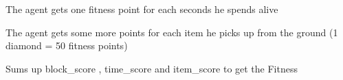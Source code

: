\documentclass[letterpaper,10pt,english]{sphinxmanual}
\begin{document}
\begin{fulllineitems}

\begin{fulllineitems}
\label{\detokenize{index:mission.mission.time_score}}
The agent gets one fitness point for each seconds he spends alive

\end{fulllineitems}


\begin{fulllineitems}
\label{\detokenize{index:mission.mission.item_score}}
The agent gets some more points for each item he picks up from the ground
(1 diamond = 50 fitness points)

\end{fulllineitems}


\begin{fulllineitems}
\label{\detokenize{index:mission.mission.score}}
Sums up block\_score , time\_score and item\_score to get the Fitness

\end{fulllineitems}


\end{fulllineitems}

\end{document}
